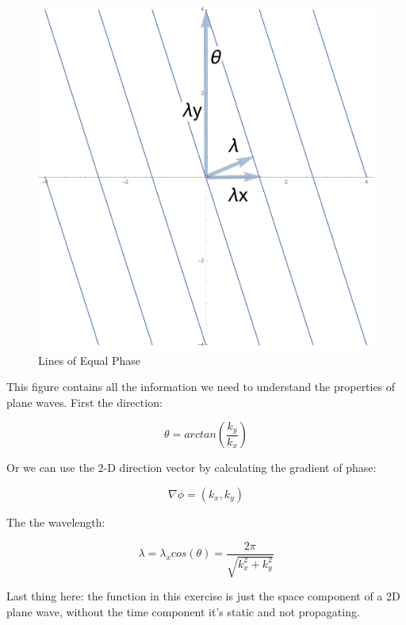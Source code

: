 \documentclass[11pt,a4paper,BCOR12mm, headexclude, footexclude, twoside, openright]{scrartcl}
\numberwithin{equation}{section} %
\numberwithin{figure}{section} %
\numberwithin{table}{section} %
\begin{document}
\begin{figure}[h!]
\centering
\includegraphics[scale=0.5]{Equal_Phase.pdf}
\caption{Lines of Equal Phase}
\end{figure}

This figure contains all the information we need to understand the properties of plane waves. First the direction:

\begin{equation}
\theta = arctan (\frac{k_y}{k_x})
\end{equation}

Or we can use the 2-D direction vector by calculating the gradient of phase:

\begin{equation}
    \nabla \phi = (k_x,k_y)
\end{equation}

The the wavelength:

\begin{equation}
    \lambda = \lambda_x cos(\theta) = \frac{2 \pi}{\sqrt{k_x ^2 + k_y ^2}}
\end{equation}

Last thing here: the function in this exercise is just the space component of a 2D plane wave, without the time component it's static and not propagating. 
\end{document}
